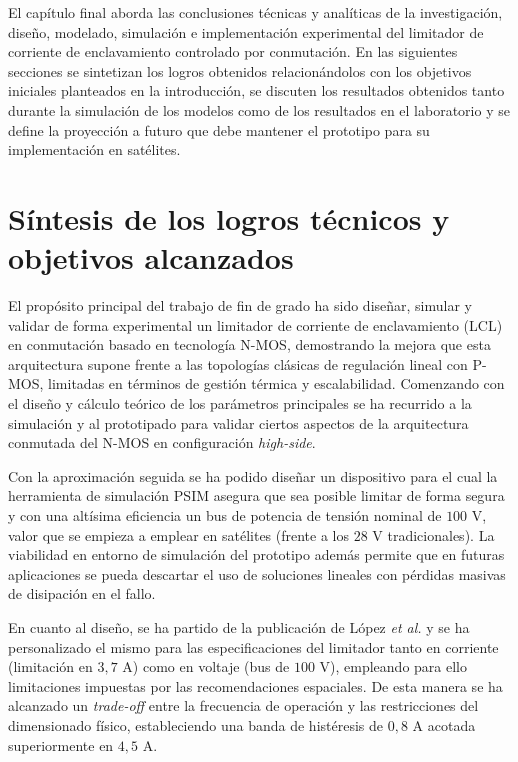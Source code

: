 \documentclass[12pt]{report} %
\begin{document}
El capítulo final aborda las conclusiones técnicas y analíticas de la investigación, diseño, modelado, simulación e implementación experimental del limitador de corriente de enclavamiento controlado por conmutación. En las siguientes secciones se sintetizan los logros obtenidos relacionándolos con los objetivos iniciales planteados en la introducción, se discuten los resultados obtenidos tanto durante la simulación de los modelos como de los resultados en el laboratorio y se define la proyección a futuro que debe mantener el prototipo para su implementación en satélites.

\section{Síntesis de los logros técnicos y objetivos alcanzados}
\label{sec:sintesis_logros}
El propósito principal del trabajo de fin de grado ha sido diseñar, simular y validar de forma experimental un limitador de corriente de enclavamiento (LCL) en conmutación basado en tecnología N-MOS, demostrando la mejora que esta arquitectura supone frente a las topologías clásicas de regulación lineal con P-MOS, limitadas en términos de gestión térmica y escalabilidad. Comenzando con el diseño y cálculo teórico de los parámetros principales se ha recurrido a la simulación y al prototipado para validar ciertos aspectos de la arquitectura conmutada del N-MOS en configuración \textit{high-side}.

Con la aproximación seguida se ha podido diseñar un dispositivo para el cual la herramienta de simulación PSIM asegura que sea posible limitar de forma segura y con una altísima eficiencia un bus de potencia de tensión nominal de $100\text{ V}$, valor que se empieza a emplear en satélites (frente a los $28\text{ V}$ tradicionales). La viabilidad en entorno de simulación del prototipo además permite que en futuras aplicaciones se pueda descartar el uso de soluciones lineales con pérdidas masivas de disipación en el fallo.

En cuanto al diseño, se ha partido de la publicación de López \textit{et al.}\cite{lopez_antuna_diseno_2024}
y se ha personalizado el mismo para las especificaciones del limitador tanto en corriente (limitación en $3{,}7\text{ A}$) como en voltaje (bus de $100\text{ V}$), empleando para ello limitaciones impuestas por las recomendaciones espaciales. De esta manera se ha alcanzado un \textit{trade-off} entre la frecuencia de operación y las restricciones del dimensionado físico, estableciendo una banda de histéresis de $0{,}8\text{ A}$ acotada superiormente en $4{,}5\text{ A}$.
\end{document}
